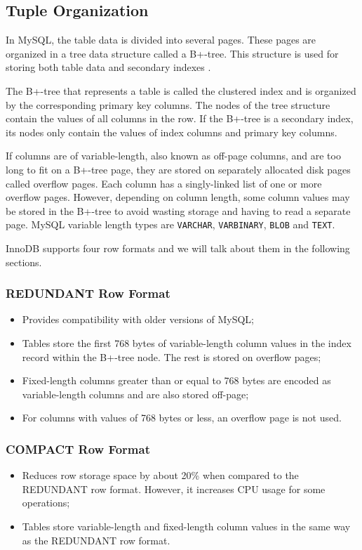 \documentclass[12pt]{article}
\begin{document}
\subsection{Tuple Organization}
\label{tuple}
In MySQL, the table data is divided into several pages. These pages are organized in a tree data structure called a B+-tree. This structure is used for storing both table data and secondary indexes \parencite{RowFormats}.

The B+-tree that represents a table is called the clustered index and is organized by the corresponding primary key columns. The nodes of the tree structure contain the values of all columns in the row. If the B+-tree is a secondary index, its nodes only contain the values of index columns and primary key columns.

If columns are of variable-length, also known as off-page columns, and are too long to fit on a B+-tree page, they are stored on separately allocated disk pages called overflow pages. Each column has a singly-linked list of one or more overflow pages. However, depending on column length, some column values may be stored in the B+-tree to avoid wasting storage and having to read a separate page.
MySQL variable length types are \verb|VARCHAR|, \verb|VARBINARY|, \verb|BLOB| and \verb|TEXT|.

\vspace{0.3cm}
InnoDB supports four row formats and we will talk about them in the following sections.

\subsubsection{REDUNDANT Row Format}
\begin{itemize}
    \item Provides compatibility with older versions of MySQL;
    \item Tables store the first 768 bytes of variable-length column values in the index record within the B+-tree node. The rest is stored on overflow pages;
    \item Fixed-length columns greater than or equal to 768 bytes are encoded as variable-length columns and are also stored off-page;
    \item For columns with values of 768 bytes or less, an overflow page is not used.
\end{itemize}


\subsubsection{COMPACT Row Format}
\begin{itemize}
    \item Reduces row storage space by about 20\% when compared to the REDUNDANT row format. However, it increases CPU usage for some operations;
    \item Tables store variable-length and fixed-length column values in the same way as the REDUNDANT row format.
\end{itemize}
\end{document}

